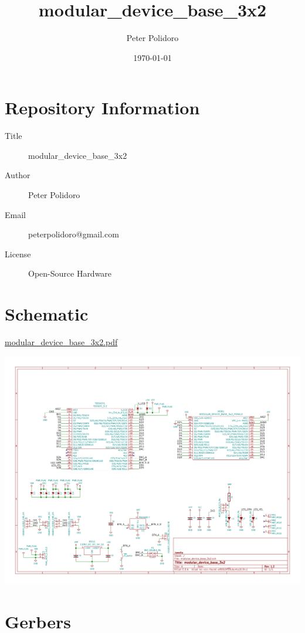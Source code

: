 \documentclass[11pt]{article}
\author{Peter Polidoro}
\date{\today}
\title{modular\_device\_base\_3x2}
\begin{document}
\maketitle
\tableofcontents


\section{Repository Information}
\label{sec:org53f9fb2}
\begin{description}
\item[{Title}] modular\_device\_base\_3x2
\item[{Author}] Peter Polidoro
\item[{Email}] peterpolidoro@gmail.com
\item[{License}] Open-Source Hardware
\end{description}

\section{Schematic}
\label{sec:org4149065}

\href{./schematic/modular\_device\_base\_3x2.pdf}{modular\_device\_base\_3x2.pdf}


\begin{center}
\includegraphics[width=.9\linewidth]{./schematic/images/schematic00.png}
\end{center}


\section{Gerbers}
\label{sec:orge85ae1a}
\end{document}
